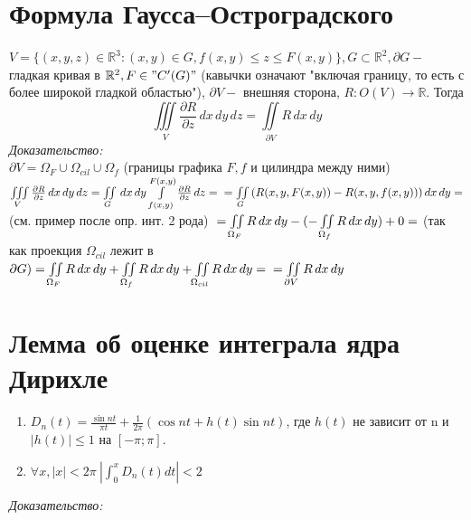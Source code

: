 \documentclass[paper=a4, fontsize=17pt]{article}
\begin{document}
\section{Формула Гаусса--Остроградского}
$V = \{(x,y,z)\in \mathbb{R}^3: (x,y) \in G, f(x, y) \leq z \leq F(x,y)\}, G \subset \mathbb{R}^2, \partial G -$ гладкая кривая в $\mathbb{R}^2, F \in "C'(G)"$ (кавычки означают "включая границу, то есть с более широкой гладкой областью"), $\partial V - $ внешняя сторона, $R: O(V) \rightarrow \mathbb{R}$. Тогда 
$$\iiint\limits_{V}{\frac {\partial R}{\partial z} \,dx\,dy\,dz = \iint\limits_{\partial V}{R\,dx\,dy}}$$
\emph{Доказательство:}\\
$\partial V = \Omega_F \cup \Omega_{cil} \cup \Omega_f$ (границы графика $F,f$ и цилиндра между ними)\\


$\iiint\limits_{V}{\frac {\partial R}{\partial z} \,dx\,dy\,dz} 
= \iint\limits_G\,dx\,dy\int\limits_{f(x,y)}^{F(x,y)} {\frac {\partial R}{\partial z} \,dz} = \\
= \iint\limits_G{(R(x,y, F(x,y)) - R(x, y, f(x,y)))\,dx\,dy} = $ (см. пример после опр. инт. 2 рода) $\\ 
= \iint\limits_{\Omega_F}{R\,dx\,dy} - (-\iint\limits_{\Omega_f}{R\,dx\,dy}) + 0  = $ (так как проекция $\Omega_{cil}$ лежит в $\partial G )\\
= \iint\limits_{\Omega_F}{R\,dx\,dy} + \iint\limits_{\Omega_f}{R\,dx\,dy} + \iint\limits_{\Omega_{cil}}{R\,dx\,dy} = \\
= \iint\limits_{\partial V}{R\,dx\,dy}$

\section{Лемма об оценке интеграла ядра Дирихле}
\begin{enumerate}
    \item $D_n(t) = \frac{\sin nt}{\pi t} + \frac{1}{2\pi}(\cos nt + h(t)\sin nt)$, где $h(t)$ не зависит от n и $|h(t)| \leq 1$
        на $[-\pi;\pi]$.
    \item $\forall x, |x| < 2\pi\ |\int_0^x D_n(t) dt| < 2$
\end{enumerate}

\emph{Доказательство:}
\end{document}
